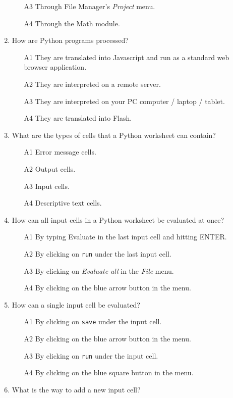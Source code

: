 \begin{enumerate}
\begin{enumerate}
\item[A3] Through File Manager's {\em Project} menu.
\item[A4] Through the Math module.
\end{enumerate}
\item How are Python programs processed?
\begin{enumerate}
\item[A1] They are translated into Javascript and run as a standard web browser application.
\item[A2] They are interpreted on a remote server.
\item[A3] They are interpreted on your PC computer / laptop / tablet.
\item[A4] They are translated into Flash.
\end{enumerate}
\item What are the types of cells that a Python worksheet can contain?
\begin{enumerate}
\item[A1] Error message cells.
\item[A2] Output cells.
\item[A3] Input cells.
\item[A4] Descriptive text cells.
\end{enumerate}
\item How can all input cells in a Python worksheet be evaluated at once?
\begin{enumerate}
\item[A1] By typing Evaluate in the last input cell and hitting ENTER.
\item[A2] By clicking on {\tt run} under the last input cell.
\item[A3] By clicking on {\em Evaluate all} in the {\em File} menu. 
\item[A4] By clicking on the blue arrow button in the menu.
\end{enumerate}
\item How can a single input cell be evaluated?
\begin{enumerate}
\item[A1] By clicking on {\tt save} under the input cell.
\item[A2] By clicking on the blue arrow button in the menu.
\item[A3] By clicking on {\tt run} under the input cell.
\item[A4] By clicking on the blue square button in the menu.
\end{enumerate}
\item What is the way to add a new input cell?

\end{enumerate}
